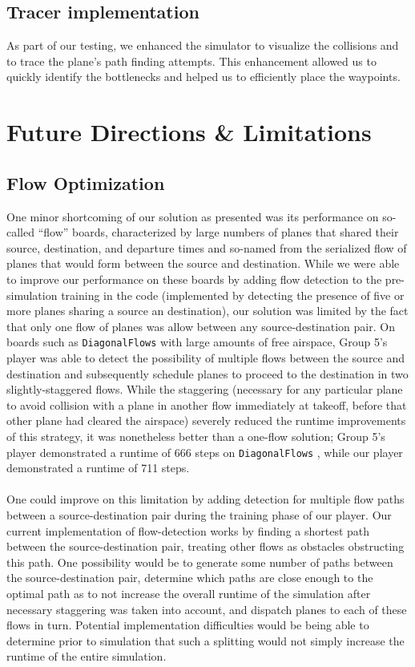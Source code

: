 \documentclass[10pt]{article}
\newcommand{\ms}[1] {
  \texttt{#1}
}
\begin{document}
\subsection{Tracer implementation}

As part of our testing, we enhanced the simulator to visualize the collisions
and to trace the plane's path finding attempts. This enhancement allowed us to
quickly identify the bottlenecks and helped us to efficiently place the
waypoints.

\newpage
\section{Future Directions \& Limitations}

\subsection{Flow Optimization}

One minor shortcoming of our solution as presented was its performance 
on so-called ``flow'' boards, characterized by large numbers  of planes that shared 
their source, destination, and departure times and so-named from the serialized 
flow of planes that would form between the source and destination.  While we
were able to improve our performance on these boards by adding flow detection
to the pre-simulation training in the code (implemented by detecting the presence
of five or more planes sharing a source an destination), our solution was limited
by the fact that only one flow of planes was allow between any source-destination
pair. On boards such as \ms{DiagonalFlows} with large amounts of free airspace, Group 5's
player was able to detect the possibility of multiple flows between the source and destination
and subsequently schedule planes to proceed to the destination in two slightly-staggered
flows. While the staggering (necessary for any particular plane to avoid collision with
a plane in another flow immediately at takeoff, before that other plane had cleared the 
airspace) severely reduced the runtime improvements of this strategy, it was nonetheless
better than a one-flow solution; Group 5's player demonstrated a runtime of 666 steps
on \ms{DiagonalFlows}, while our player demonstrated a runtime of 711 steps.\\\\
One could improve on this limitation by adding detection for multiple flow paths between
a source-destination pair during the training phase of our player. Our current implementation
of flow-detection works by finding a shortest path between the source-destination pair, treating
other flows as obstacles obstructing this path. One possibility would be to generate some number
of paths between the source-destination pair, determine which paths are close enough to the
optimal path as to not increase the overall runtime of the simulation after necessary 
staggering was taken into account, and dispatch planes to each of these flows in turn.
Potential implementation difficulties would be being able to determine prior to simulation
that such a splitting would not simply increase the runtime of the entire simulation.
\end{document}
